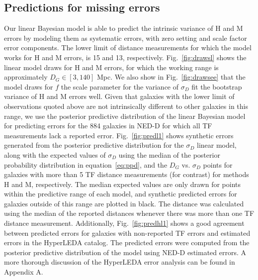 \documentclass[a4paper,fleqn,usenatbib]{mnras}
\begin{document}
\subsection{Predictions for missing errors}
\label{sec:pred} 
Our linear Bayesian model is able to predict the intrinsic variance of H and M errors by modeling them as systematic errors, with zero setting and scale factor error components. The lower limit of distance measurements for which the model works for H and M errors, is 15 and 13, respectively. Fig.~\ref{fig:drawsl} shows the linear model draws for H and M errors, for which the working range is approximately $D_G\in[3,140]$ Mpc. We also show in Fig.~\ref{fig:drawsee} that the model draws for $f$ the scale parameter for the variance of $\sigma_D$ fit the bootstrap variance of H and M errors well. Given that galaxies with the lower limit of observations quoted above are not intrinsically different to other galaxies in this range, we use the posterior predictive distribution of the linear Bayesian model for predicting errors for the 884 galaxies in NED-D for which all TF measurements lack a reported error. Fig.~\ref{fig:predl1} shows synthetic errors generated from the posterior predictive distribution for the $\sigma_D$ linear model, along with the expected values of $\sigma_D$ using the median of the posterior probability distribution in equation~\ref{eq:ppd}, and the $D_G$ vs. $\sigma_D$ points for galaxies with more than 5 TF distance measurements (for contrast) for methods H and M, respectively. The median expected values are only drawn for points within the predictive range of each model, and synthetic predicted errors for galaxies outside of this range are plotted in black. The distance was calculated using the median of the reported distances whenever there was more than one TF distance measurement. Additionally, Fig.~\ref{fig:predhl1}  shows a good agreement between predicted errors for galaxies with non-reported TF errors and estimated errors in the HyperLEDA catalog. The predicted errors were computed from the posterior predictive distribution of the model using NED-D estimated errors. A more thorough discussion of the HyperLEDA error analysis can be found in Appendix A.\\
\end{document}
